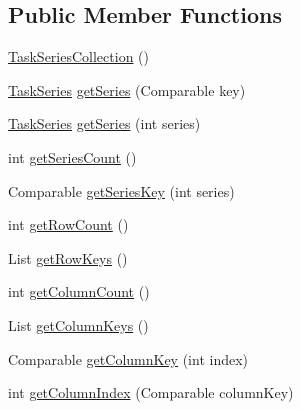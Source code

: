 \subsection*{Public Member Functions}
\begin{DoxyCompactItemize}
\item 
\mbox{\hyperlink{classorg_1_1jfree_1_1data_1_1gantt_1_1_task_series_collection_a20e157fb6b3e78bc08d7b00b900fe579}{Task\+Series\+Collection}} ()
\item 
\mbox{\hyperlink{classorg_1_1jfree_1_1data_1_1gantt_1_1_task_series}{Task\+Series}} \mbox{\hyperlink{classorg_1_1jfree_1_1data_1_1gantt_1_1_task_series_collection_aeb3f23345d5161b6c6a9607012dda1e2}{get\+Series}} (Comparable key)
\item 
\mbox{\hyperlink{classorg_1_1jfree_1_1data_1_1gantt_1_1_task_series}{Task\+Series}} \mbox{\hyperlink{classorg_1_1jfree_1_1data_1_1gantt_1_1_task_series_collection_a13b6cac5d9a3bcce94bf1b59151a1036}{get\+Series}} (int series)
\item 
int \mbox{\hyperlink{classorg_1_1jfree_1_1data_1_1gantt_1_1_task_series_collection_a03600043169c348a631e3eb004994405}{get\+Series\+Count}} ()
\item 
Comparable \mbox{\hyperlink{classorg_1_1jfree_1_1data_1_1gantt_1_1_task_series_collection_ad96b23be1ed0fb18e07b399d23fe486e}{get\+Series\+Key}} (int series)
\item 
int \mbox{\hyperlink{classorg_1_1jfree_1_1data_1_1gantt_1_1_task_series_collection_a241faa2771f4db77832e388e6a63026b}{get\+Row\+Count}} ()
\item 
List \mbox{\hyperlink{classorg_1_1jfree_1_1data_1_1gantt_1_1_task_series_collection_a049adf2f25b6b3b2ea567fe902bf9b76}{get\+Row\+Keys}} ()
\item 
int \mbox{\hyperlink{classorg_1_1jfree_1_1data_1_1gantt_1_1_task_series_collection_a3435a5d25be65ed939629418205b0022}{get\+Column\+Count}} ()
\item 
List \mbox{\hyperlink{classorg_1_1jfree_1_1data_1_1gantt_1_1_task_series_collection_a7d5753768700a7a2e33f6e2918aa6ecd}{get\+Column\+Keys}} ()
\item 
Comparable \mbox{\hyperlink{classorg_1_1jfree_1_1data_1_1gantt_1_1_task_series_collection_ae2f2a653fe8b60273034e7237b19118f}{get\+Column\+Key}} (int index)
\item 
int \mbox{\hyperlink{classorg_1_1jfree_1_1data_1_1gantt_1_1_task_series_collection_a3d161e58090dcf60534fd670a387f429}{get\+Column\+Index}} (Comparable column\+Key)
\item 

\end{DoxyCompactItemize}
